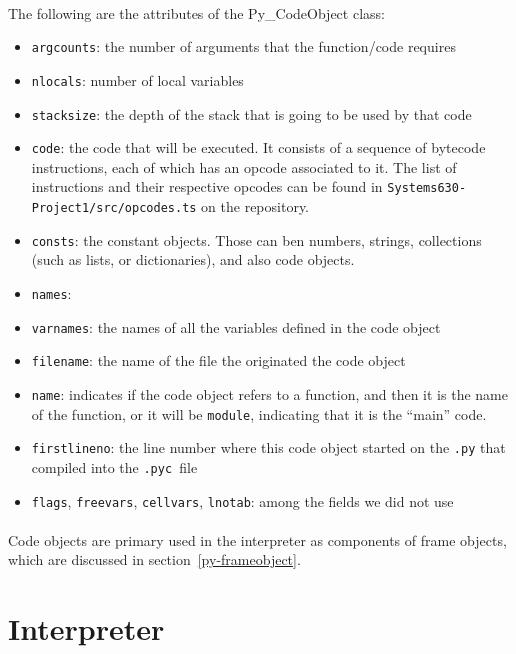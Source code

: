 \documentclass{article}
\newcommand{\pyc}{\texttt{.pyc~}}
\begin{document}
\paragraph{}
The following are the attributes of the Py\_CodeObject class:

\begin{itemize}
	\item \texttt{argcounts}: the number of arguments that the function/code requires
	\item \texttt{nlocals}: number of local variables
	\item \texttt{stacksize}: the depth of the stack that is going to be used by that code
	\item \texttt{code}: the code that will be executed. It consists of a sequence of bytecode instructions, each of which has an opcode associated to it. The list of instructions and their respective opcodes can be found in \texttt{Systems630-Project1/src/opcodes.ts} on the repository.
	\item \texttt{consts}: the constant objects. Those can ben numbers, strings, collections (such as lists, or dictionaries), and also code objects.  
	\item \texttt{names}: 
	\item \texttt{varnames}: the names of all the variables defined in the code object
	\item \texttt{filename}: the name of the file the originated the code object
	\item \texttt{name}: indicates if the code object refers to a function, and then it is the name of the function, or it will be \texttt{module}, indicating that it is the ``main'' code.
	\item \texttt{firstlineno}: the line number where this code object started on the \texttt{.py} that compiled into the \pyc file
	\item \texttt{flags}, \texttt{freevars}, \texttt{cellvars}, \texttt{lnotab}: among the fields we did not use
	\end{itemize}

\paragraph{}
Code objects are primary used in the interpreter as components of frame objects, which are discussed in section~\ref{py-frameobject}.

\section{Interpreter}\label{interpreter}
\end{document}
